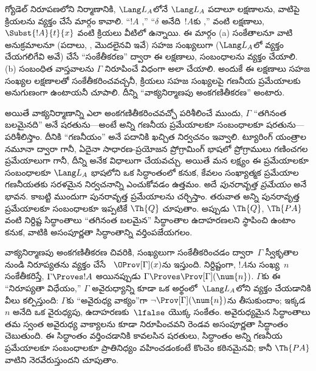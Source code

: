 \documentclass[../../../include/open-logic-section]{subfiles}
\begin{document}
గ్యోడెల్ నిరూపణలోని నిర్మాణానికి, $\Lang L_A$లోనే $\Lang L_A$ పదాలూ
 లక్షణాలను, వాటిపై క్రియలను వ్యక్తం చేసే మార్గం
కావాలి. ``$!A$ ,'' ``$\delta$ అనేది~$!A$కు
,'' వంటి లక్షణాలు, $\Subst{!A}{t}{x}$
వంటి క్రియలు వీటిలో ఉన్నాయి. ఈ మార్గం (a) సంకేతాలనూ వాటి అనుక్రమాలనూ (పదాలు,
, 
మొదలైనవి ఇవే) సహజ సంఖ్యలుగా ($\Lang L_A$లో వ్యక్తం చేయగలిగేవి అవే) చేసే
``సంకేతీకరణ'' ద్వారా ఈ లక్షణాలు, సంబంధాలను వ్యక్తం చేయాలి. (b) సంబంధిత వాస్తవాలను
$\Gamma$ నిరూపించే విధంగా అలా చేయాలి. అందుకే ఈ లక్షణాలు సహజ సంఖ్యల
 లక్షణాలతో సంకేతీకరించవచ్చనీ, క్రియలు
సహజ సంఖ్యలపై గణనీయ ప్రమేయాలకు అనుగుణంగా ఉంటాయనీ చూపాలి. దీన్ని
``వాక్యనిర్మాణపు అంకగణితీకరణ'' అంటారు.

అయితే వాక్యనిర్మాణాన్ని ఎలా అంకగణితీకరించవచ్చో పరిశీలించే ముందు, $\Gamma$
``తగినంత బలమైనది'' అనే షరతును---అంటే అన్ని గణనీయ ప్రమేయాలకూ
 సంబంధాలకూ
 షరతును---పరిశీలిస్తాం.
దీనికి ``గణనీయం'' అనే పదానికి ఖచ్చిత నిర్వచనం ఇవ్వాలి. ట్యూరింగ్ యంత్రాల నమూనా
ద్వారా గానీ, ఏదైనా సాధారణ-ప్రయోజన ప్రోగ్రామింగ్ భాషలో ప్రోగ్రాములు గణించగల
ప్రమేయాలుగా గానీ, దీన్ని అనేక విధాలుగా చేయవచ్చు. అయితే మన లక్ష్యం ఈ ప్రమేయాలకూ
సంబంధాలకూ $\Lang L_A$ భాషలోని ఒక సిద్ధాంతంలో
 కనుక, కేవలం సంఖ్యాత్మక
ప్రమేయాల గణనీయతకు సరళమైన నిర్వచనాన్ని ఎంచుకోవడం ఉత్తమం. అదే
\emph{పునరావృత్త ప్రమేయం} అనే భావన. కాబట్టి ముందుగా పునరావృత్త ప్రమేయాలను
చర్చిస్తాం. తరువాత అన్ని పునరావృత్త ప్రమేయాలకూ సంబంధాలకూ ఇప్పటికే $\Th{Q}$
 చూపుతాం. అప్పుడు $\Th{Q}$,
$\Th{PA}$ వంటి నిర్దిష్ట
సిద్ధాంతాలు ``తగినంత బలమైన'' సిద్ధాంతాల ఉదాహరణలని స్థాపించి ఉంటాం కనుక,
వాటికి అసంపూర్ణతా సిద్ధాంతాన్ని వర్తింపజేయగలం.

వాక్యనిర్మాణపు అంకగణితీకరణ చివరికి,  సంఖ్యలుగా
సంకేతీకరించడం ద్వారా~$\Gamma$ స్వీకృతాల నుండి నిరూప్యతను వ్యక్తం చేసే
~$\OProv[\Gamma](x)$ను ఇస్తుంది. నిర్దిష్టంగా,
$!A$ను సంఖ్య~$n$ సంకేతీకరిస్తే, $\Gamma\Proves !A$ అయినప్పుడు
$\Gamma\Proves\Prov[\Gamma](\num{n})$. $\Gamma$కు ఈ ``నిరూప్యతా విధేయం,''
$\Gamma$ అవైరుధ్యాన్ని కూడా ఒక అర్థంలో~$\Lang L_A$లోని
 వ్యక్తం చేయడానికి వీలు కల్పిస్తుంది:
$\Gamma$కు ``అవైరుధ్య వాక్యం''గా 
$\lnot\Prov[\Gamma](\num{n})$ను తీసుకుందాం; ఇక్కడ $n$ అనేది ఒక వైరుధ్యపు,
ఉదాహరణకు~$\lfalse$ యొక్క సంకేతం. అవైరుధ్యమైన
 సిద్ధాంతాలు తమ స్వంత అవైరుధ్య
వాక్యాలను కూడా నిరూపించవని రెండవ అసంపూర్ణతా సిద్ధాంతం చెబుతుంది. ఈ సిద్ధాంతం
వర్తించడానికి కావలసిన షరతులు, సిద్ధాంతం అన్ని గణనీయ ప్రమేయాలకూ
 సంబంధాలకూ ప్రాతినిధ్యం వహించడంకంటే
కొంచెం కఠినమైనవి; కానీ $\Th{PA}$ వాటిని నెరవేరుస్తుందని చూపుతాం.
\end{document}

